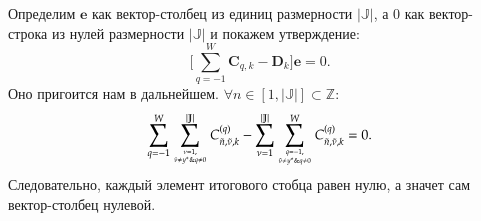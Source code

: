 Определим \(\boldsymbol{e}\) как вектор-столбец из единиц размерности \(|\mathbb{J}|\), 
а \(0\) как вектор-строка из нулей размерности \(|\mathbb{J}|\) и покажем утверждение:
\begin{equation} \label{summa_na_edinich_nol}
	\bigg[\sum_{q = -1}^{W} \boldsymbol{C}_{q,k}-\boldsymbol{D}_k\bigg]\boldsymbol{e}=0.
\end{equation}
Оно пригоится нам в дальнейшем. \(\forall n \in [1, |\mathbb{J}|] \subset \mathbb{Z}\):
\[\sum_{q = -1}^{W}\sum_{\nu = 1, \atop \tilde{\nu}\neq y^*\& q\neq 0}^{|\mathbb{J}|} C^{(q)}_{\tilde{n}, \tilde{\nu},k}-
\sum_{\nu = 1}^{|\mathbb{J}|}\sum_{q = -1 ,\atop \tilde{\nu}\neq y^*\& q\neq 0 }^{W}C^{(q)}_{\tilde{n}, \tilde{\nu},k} = 0.\]
Следовательно, каждый элемент итогового стобца равен нулю, а значет сам вектор-столбец нулевой.
\begin{comment}
Благодаря утверждению \eqref{summa_na_edinich_nol} можем преобразовать  \eqref{uravnenie_isaeva}:
\[\pdv{\boldsymbol{H}(u,t)}{t}\overline{\boldsymbol{E}}=\boldsymbol{H}(u,t)(e^{ju}-1)\]
\begin{align*}
\pdv{\boldsymbol{H}(u,t)}{t}\boldsymbol{e}=&\boldsymbol{H}(u,t)(e^{ju}-1)\boldsymbol{B}\boldsymbol{e}+j\sigma e^{-ju}\frac{\partial \boldsymbol{H}(u,t)}{\partial u}(e^{ju}-1)\boldsymbol{I_{0}}\boldsymbol{e}=\\
&=(e^{ju}-1)\{\boldsymbol{H}(u,t)\boldsymbol{B}\boldsymbol{e}+j\sigma e^{-ju}\frac{\partial \boldsymbol{H}(u,t)}{\partial u}\boldsymbol{I_{0}} \boldsymbol{e}\}
\end{align*} 
\end{comment}
